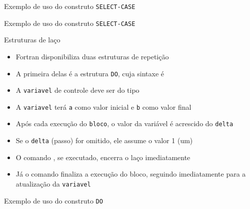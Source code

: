 \begin{frame}[fragile]{Exemplo de uso do construto {\tt SELECT-CASE}}
\end{frame}

\begin{frame}[fragile]{Exemplo de uso do construto {\tt SELECT-CASE}}
\end{frame}

\begin{frame}[fragile]{Estruturas de laço}

    \begin{itemize}
        \item Fortran disponibiliza duas estruturas de repetição

        \item A primeira delas é a estrutura \texttt{DO}, cuja sintaxe é


        \item A \texttt{variavel} de controle deve ser do tipo 

        \item A \texttt{variavel} terá \texttt{a} como valor inicial e \texttt{b} como valor
            final

        \item Após cada execução do \texttt{bloco}, o valor da variável é acrescido do 
            \texttt{delta}

        \item Se o \texttt{delta} (passo) for omitido, ele assume o valor 1 (um)

        \item O comando , se executado, encerra o laço imediatamente

        \item Já o comando  finaliza a execução do bloco, seguindo 
            imediatamente para a atualização da \texttt{variavel}
    \end{itemize}

\end{frame}

\begin{frame}[fragile]{Exemplo de uso do construto {\tt DO}}
\end{frame}

